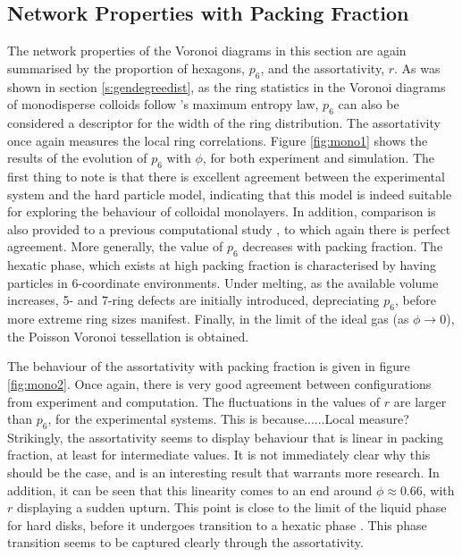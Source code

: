 \subsection{Network Properties with Packing Fraction}

The network properties of the Voronoi diagrams in this section are again summarised by the proportion of hexagons, $p_6$, and the assortativity, $r$.
As was shown in section \ref{s:gendegreedist}, as the ring statistics in the Voronoi diagrams of monodisperse \qtd{} colloids follow \lm's maximum entropy law, $p_6$ can also be considered a descriptor for the width of the ring distribution.
The assortativity once again measures the local ring correlations.
Figure \ref{fig:mono1} shows the results of the evolution of $p_6$ with $\phi$, for both experiment and simulation.
The first thing to note is that there is excellent agreement between the experimental system and the hard particle model, indicating that this model is indeed suitable for exploring the behaviour of colloidal monolayers.
In addition, comparison is also provided to a previous computational study \cite{Kumar2005}, to which again there is perfect agreement.
More generally, the value of $p_6$ decreases with packing fraction.
The hexatic phase, which exists at high packing fraction is characterised by having particles in 6\--coordinate environments.
Under melting, as the available volume increases, 5\-- and 7\--ring defects are initially introduced, depreciating $p_6$, before more extreme ring sizes manifest.
Finally, in the limit of the ideal gas (as $\phi\rightarrow 0$), the Poisson Voronoi tessellation is obtained.

The behaviour of the assortativity with packing fraction is given in figure \ref{fig:mono2}.
Once again, there is very good agreement between configurations from experiment and computation.
The fluctuations in the values of $r$ are larger than $p_6$, for the experimental systems.
This is because......Local measure? 
Strikingly, the assortativity seems to display behaviour that is linear in packing fraction, at least for intermediate values.
It is not immediately clear why this should be the case, and is an interesting result that warrants more research.
In addition, it can be seen that this linearity comes to an end around $\phi\approx 0.66$, with $r$ displaying a sudden upturn.
This point is close to the limit of the liquid phase for hard disks, before it undergoes transition to a hexatic phase \cite{Thorneywork2017}.
This phase transition seems to be captured clearly through the assortativity.

